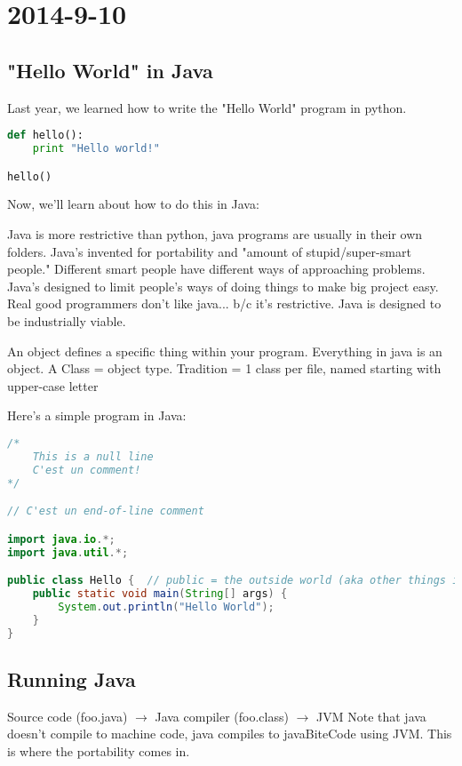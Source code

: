 \documentclass [12 pt, twoside] {article}
\begin{document}
\newpage
\section{2014-9-10}
\subsection{"Hello World" in Java}


Last year, we learned how to write the "Hello World" program in python.
\begin{lstlisting}[language=Python]
def hello():
	print "Hello world!"

hello()
\end{lstlisting}


Now, we'll learn about how to do this in Java:


Java is more restrictive than python, java programs are usually in their own folders.
Java's invented for portability and "amount of stupid/super-smart people."
Different smart people have different ways of approaching problems.
Java's designed to limit people's ways of doing things to make big project easy.
Real good programmers don't like java... b/c it's restrictive.
Java is designed to be industrially viable.


An object defines a specific thing within your program.
Everything in java is an object.
\newline A Class = object type.
\newline Tradition = 1 class per file, named starting with upper-case letter


Here's a simple program in Java:
\begin{lstlisting}[language=Java]
/*
	This is a null line
	C'est un comment!
*/

// C'est un end-of-line comment

import java.io.*;
import java.util.*;

public class Hello {  // public = the outside world (aka other things in your program) can see this
	public static void main(String[] args) {
		System.out.println("Hello World");
	}
}
\end{lstlisting}


\subsection{Running Java}
Source code (foo.java) $\to$ Java compiler (foo.class) $\to$ JVM
\newline Note that java doesn't compile to machine code, java compiles to javaBiteCode using JVM. This is where the portability comes in.
\end{document}
